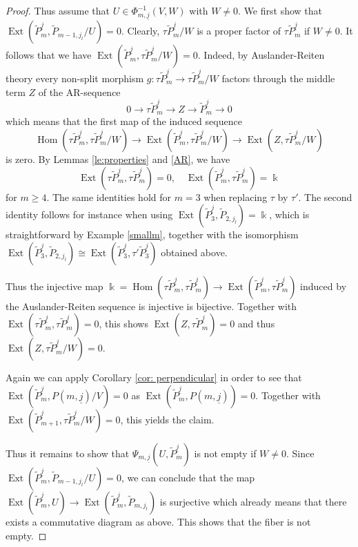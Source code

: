 \documentclass{amsart}
\newcommand{\uj}{\underline j}
\newcommand{\kk}{\Bbbk}
\newcommand{\Ext}{\operatorname{Ext}}
\newcommand{\Hom}{\operatorname{Hom}}
\newcommand{\ses}[3]{0\rightarrow #1\rightarrow #2\rightarrow#3\rightarrow 0}
\begin{document}
\begin{proof}
Thus assume that $U\in\Phi_{m,\uj}^{-1}(V,W)$ with $W\neq 0$. We first show that $\Ext(\tilde P_{m}^{\uj},\tilde P_{m-1,j_l}/U)= 0$. Clearly, $\tau\tilde P_{m}^{\uj}/W$ is a proper factor of $\tau \tilde P_{m}^{\uj}$ if $W\neq 0$. 
It follows that we have $\Ext(\tilde P_{m}^{\uj},\tau\tilde P_{m}^{\uj}/W)=0$. Indeed, by Auslander-Reiten theory every non-split morphism $g:\tau\tilde P_{m}^{\uj}\to \tau\tilde P_{m}^{\uj}/W$ factors through the middle term $Z$ of the AR-sequence 
\[\ses{\tau\tilde P_{m}^{\uj}}{Z}{\tilde P_{m}^{\uj}}\]
which means that the first map of the induced sequence
\[\Hom(\tau\tilde P_{m}^{\uj},\tau\tilde P_{m}^{\uj}/W)\to\Ext(\tilde P_{m}^{\uj},\tau\tilde P_{m}^{\uj}/W)\to\Ext(Z,\tau\tilde P_{m}^{\uj}/W) \]
is zero. By Lemmas \ref{le:properties} and \ref{AR}, we have 
$$\Ext(\tau\tilde P_m^{\uj},\tau\tilde P_m^{\uj})=0,\quad \Ext(\tilde P_m^{\uj},\tau\tilde P_m^{\uj})=\kk$$
for $m\geq 4$. The same identities hold for $m=3$ when replacing $\tau$ by $\tau'$. The second identity follows for instance when using $\Ext(\tilde P_{3}^{\uj},\tilde P_{2,j_l})=\kk$, which is straightforward by Example \ref{smallm}, together with the isomorphism $\Ext(\tilde P_{3}^{\uj},\tilde P_{2,j_l})\cong\Ext(\tilde P_{3}^{\uj},\tau'\tilde P_{3}^{\uj})$ obtained above.

Thus the injective map $\kk=\Hom(\tau \tilde P_{m}^{\uj},\tau \tilde P_{m}^{\uj})\to\Ext(\tilde P_{m}^{\uj},\tau \tilde P_{m}^{\uj})$ induced by the Auslander-Reiten sequence is injective is bijective. Together with $\Ext(\tau \tilde P_{m}^{\uj},\tau \tilde P_{m}^{\uj})=0$, this shows $\Ext(Z,\tau\tilde P_{m}^{\uj})=0$ and thus $\Ext(Z,\tau\tilde P_{m}^{\uj}/W)=0$.



Again we can apply Corollary \ref{cor: perpendicular} in order to see that $\Ext(\tilde P_{m}^{\uj},P(m,\uj)/V)=0$ as $\Ext(\tilde P_{m}^{\uj},P(m,\uj))=0$. 
 Together with $\Ext(\tilde P_{m+1}^{\uj},\tau\tilde P_{m}^{\uj}/W)=0$, this yields the claim.

Thus it remains to show that $\Psi_{m,\uj}(U,\tilde P_{m}^{\uj})$ is not empty if $W\neq 0$. Since $\Ext(\tilde P_{m}^{\uj},\tilde P_{m-1,j_l}/U)= 0$, we can conclude that the map $\Ext(\tilde P_{m}^{\uj},U)\to\Ext(\tilde P_{m}^{\uj},\tilde P_{m,j_l})$ is surjective which already means that there exists a commutative diagram as above. This shows that the fiber is not empty.
\end{proof}
\end{document}
